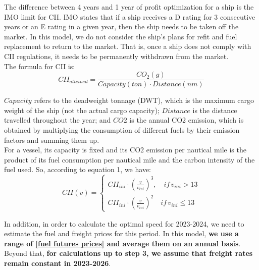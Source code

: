 \documentclass[a4paper,12pt]{article}
\begin{document}
The difference between 4 years and 1 year of profit optimization for a ship is the IMO limit for CII.
IMO states that if a ship receives a D rating for 3 consecutive years or an E rating in a given year, then the ship needs to be taken off the market.
In this model, we do not consider the ship's plans for refit and fuel replacement to return to the market.
That is, once a ship does not comply with CII regulations, it needs to be permanently withdrawn from the market.\\

The formula for CII is:
\begin{equation}
	\label{eq:cii}
	CII_{atteined} = \frac{CO_2(g)}{Capacity(ton) \cdot Distance(nm)}
\end{equation}

$Capacity$ refers to the deadweight tonnage (DWT), which is the maximum cargo weight of the ship (not the actual cargo capacity);
$Distance$ is the distance travelled throughout the year;
and $CO2$ is the annual CO2 emission, which is obtained by multiplying the consumption of different fuels by their emission factors and summing them up.\\

For a vessel, its capacity is fixed and its CO2 emission per nautical mile is the product of its fuel consumption per nautical mile and the carbon intensity of the fuel used.
So, according to equation 1, we have:
\begin{equation}
	\label{eq:cii_model}
	CII(v) =
	\left\{
	\begin{aligned}
		CII_{ini}\cdot (\frac{v}{v_{ini}})^3, \quad if \, v_{ini} > 13 \\
		CII_{ini} \cdot (\frac{v}{v_{ini}})^2 \quad if \, v_{ini}\leq 13
	\end{aligned}
	\right.
\end{equation}

In addition, in order to calculate the optimal speed for 2023-2024, we need to estimate the fuel and freight prices for this period.
In this model, \textbf{we use a range of \href{https://www.cmegroup.com/markets/energy/refined-products/singapore-380cst-fuel-oil-platts-swap-futures.html}{[fuel futures prices]} and average them on an annual basis}.
Beyond that, \textbf{for calculations up to step 3, we assume that freight rates remain constant in 2023-2026}.\\
\end{document}
